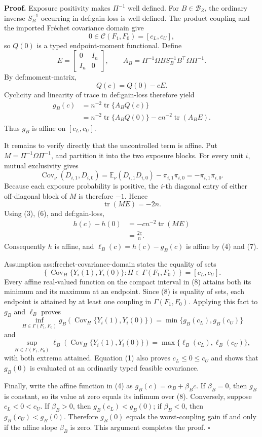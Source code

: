 \textbf{Proof.}
Exposure positivity makes \(\Pi^{-1}\) well defined.  For
\(B\in\mathcal B_Z\), the ordinary inverse \(S_B^{-1}\) occurring in
def:gain-loss is well defined.  The product coupling and the imported
Fr\'echet covariance domain give
\[
0\in\mathcal C(F_1,F_0)=[c_L,c_U],
\tag{1}
\]
so \(Q(0)\) is a typed endpoint-moment functional.  Define
\[
E=\begin{bmatrix}0&I_n\\ I_n&0\end{bmatrix},
\qquad
A_B=\Pi^{-1}\Omega B S_B^{-1}B^{\top}\Omega\Pi^{-1}.
\tag{2}
\]
By def:moment-matrix,
\[
Q(c)=Q(0)-cE.
\tag{3}
\]
Cyclicity and linearity of trace in def:gain-loss therefore yield
\[
\begin{aligned}
g_B(c)
&=n^{-2}\operatorname{tr}\{A_BQ(c)\}\\
&=n^{-2}\operatorname{tr}\{A_BQ(0)\}
-c n^{-2}\operatorname{tr}(A_BE).
\end{aligned}
\tag{4}
\]
Thus \(g_B\) is affine on \([c_L,c_U]\).

It remains to verify directly that the uncontrolled term is affine.  Put
\(M=\Pi^{-1}\Omega\Pi^{-1}\), and partition it into the two exposure
blocks.  For every unit \(i\), mutual exclusivity gives
\[
\operatorname{Cov}_{\nu}(D_{i,1},D_{i,0})
=\mathbb E_{\nu}(D_{i,1}D_{i,0})-\pi_{i,1}\pi_{i,0}
=-\pi_{i,1}\pi_{i,0}.
\tag{5}
\]
Because each exposure probability is positive, the \(i\)-th diagonal
entry of either off-diagonal block of \(M\) is therefore \(-1\).  Hence
\[
\operatorname{tr}(ME)=-2n.
\tag{6}
\]
Using (3), (6), and def:gain-loss,
\[
\begin{aligned}
h(c)-h(0)
&=-c n^{-2}\operatorname{tr}(ME)\\
&=\frac{2c}{n}.
\end{aligned}
\tag{7}
\]
Consequently \(h\) is affine, and
\(\ell_B(c)=h(c)-g_B(c)\) is affine by (4) and (7).

Assumption ass:frechet-covariance-domain states the equality of sets
\[
\left\{\operatorname{Cov}_H\{Y_i(1),Y_i(0)\}:
H\in\Gamma(F_1,F_0)\right\}=[c_L,c_U].
\tag{8}
\]
Every affine real-valued function on the compact interval in (8) attains
both its minimum and its maximum at an endpoint.  Since (8) is equality of
sets, each endpoint is attained by at least one coupling in
\(\Gamma(F_1,F_0)\).  Applying this fact to \(g_B\) and \(\ell_B\)
proves
\[
\inf_{H\in\Gamma(F_1,F_0)}
g_B\!\left(\operatorname{Cov}_H\{Y_i(1),Y_i(0)\}\right)
=\min\{g_B(c_L),g_B(c_U)\}
\tag{9}
\]
and
\[
\sup_{H\in\Gamma(F_1,F_0)}
\ell_B\!\left(\operatorname{Cov}_H\{Y_i(1),Y_i(0)\}\right)
=\max\{\ell_B(c_L),\ell_B(c_U)\},
\tag{10}
\]
with both extrema attained.  Equation (1) also proves
\(c_L\le 0\le c_U\) and shows that \(g_B(0)\) is evaluated at an
ordinarily typed feasible covariance.

Finally, write the affine function in (4) as
\(g_B(c)=\alpha_B+\beta_Bc\).  If \(\beta_B=0\), then \(g_B\) is
constant, so its value at zero equals its infimum over (8).  Conversely,
suppose \(c_L<0<c_U\).  If \(\beta_B>0\), then
\(g_B(c_L)<g_B(0)\); if \(\beta_B<0\), then
\(g_B(c_U)<g_B(0)\).  Therefore \(g_B(0)\) equals the worst-coupling
gain if and only if the affine slope \(\beta_B\) is zero.  This argument
completes the proof. \(\square\)